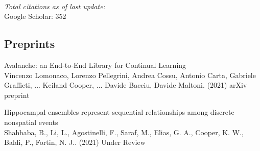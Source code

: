 \documentclass[10pt]{cooperCV2}
\begin{document}
%	






\needspace{\headerpush}
\myRule{\columnwidth}{1pt}\\

\textit{Total citations as of last update:}\\
\aiGoogleScholar \hspace{0.05cm} Google Scholar: 352

 
 
	

\subsection{Preprints} 
\begin{etaremune}[itemindent=-1.5\bibhang, topsep=0pt,
				   itemsep=\bibsep,partopsep=0pt,parsep=0pt,leftmargin={\bibhang+\widthof{[999]}}] 
    
    \item Avalanche: an End-to-End Library for Continual Learning \\
     Vincenzo Lomonaco, Lorenzo Pellegrini, Andrea Cossu, Antonio Carta, Gabriele Graffieti, ... Keiland Cooper, ... Davide Bacciu, Davide Maltoni. (2021) arXiv preprint 
     
	
    \item Hippocampal ensembles represent sequential relationships among discrete nonspatial events \\
     Shahbaba, B., Li, L., Agostinelli, F., Saraf, M., Elias, G. A., Cooper, K. W., Baldi, P.,  Fortin, N. J.. (2021) Under Review 
     
	

\end{etaremune}

 

	
\end{document}
